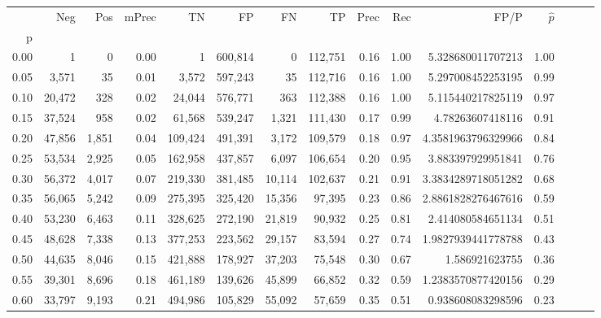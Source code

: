 \begin{tabular}{rrrrrrrrrrrrrrr}
\toprule
{} &     Neg &    Pos & mPrec &       TN &       FP &       FN &       TP &  Prec &   Rec &                 FP/P & $\hat{p}$ \\
p    &         &        &       &          &          &          &          &       &       &                      &           \\
\midrule
0.00 &       1 &      0 &  0.00 &        1 &  600,814 &        0 &  112,751 &  0.16 &  1.00 &    5.328680011707213 &      1.00 \\
0.05 &   3,571 &     35 &  0.01 &    3,572 &  597,243 &       35 &  112,716 &  0.16 &  1.00 &    5.297008452253195 &      0.99 \\
0.10 &  20,472 &    328 &  0.02 &   24,044 &  576,771 &      363 &  112,388 &  0.16 &  1.00 &    5.115440217825119 &      0.97 \\
0.15 &  37,524 &    958 &  0.02 &   61,568 &  539,247 &    1,321 &  111,430 &  0.17 &  0.99 &     4.78263607418116 &      0.91 \\
0.20 &  47,856 &  1,851 &  0.04 &  109,424 &  491,391 &    3,172 &  109,579 &  0.18 &  0.97 &   4.3581963796329966 &      0.84 \\
0.25 &  53,534 &  2,925 &  0.05 &  162,958 &  437,857 &    6,097 &  106,654 &  0.20 &  0.95 &    3.883397929951841 &      0.76 \\
0.30 &  56,372 &  4,017 &  0.07 &  219,330 &  381,485 &   10,114 &  102,637 &  0.21 &  0.91 &   3.3834289718051282 &      0.68 \\
0.35 &  56,065 &  5,242 &  0.09 &  275,395 &  325,420 &   15,356 &   97,395 &  0.23 &  0.86 &   2.8861828276467616 &      0.59 \\
0.40 &  53,230 &  6,463 &  0.11 &  328,625 &  272,190 &   21,819 &   90,932 &  0.25 &  0.81 &    2.414080584651134 &      0.51 \\
0.45 &  48,628 &  7,338 &  0.13 &  377,253 &  223,562 &   29,157 &   83,594 &  0.27 &  0.74 &   1.9827939441778788 &      0.43 \\
0.50 &  44,635 &  8,046 &  0.15 &  421,888 &  178,927 &   37,203 &   75,548 &  0.30 &  0.67 &       1.586921623755 &      0.36 \\
0.55 &  39,301 &  8,696 &  0.18 &  461,189 &  139,626 &   45,899 &   66,852 &  0.32 &  0.59 &   1.2383570877420156 &      0.29 \\
0.60 &  33,797 &  9,193 &  0.21 &  494,986 &  105,829 &   55,092 &   57,659 &  0.35 &  0.51 &    0.938608083298596 &      0.23 \\

\end{tabular}
